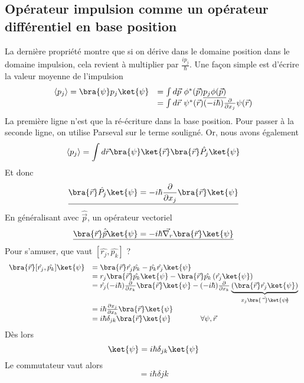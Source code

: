 	\subsection{Opérateur impulsion comme un opérateur différentiel en base position}
	La dernière propriété montre que si on dérive dans le domaine position dans le domaine impulsion, 
	cela revient à multiplier par $\frac{ip_j}{\hbar}$.  Une façon simple est d'écrire la valeur moyenne de 	
	l'impulsion
	\begin{equation}
	\begin{array}{ll}
	\langle p_j\rangle = \bra{\psi}p_j\ket{\psi} &= \int d\vec{p}\ \phi^*(\vec{p})\underline{p_j\phi(\vec{p})}\\
	&= \int d\vec{r}\ \psi^*(\vec{r})(-i\hbar)\frac{\partial}{\partial x_j}\psi(\vec{r})
	\end{array}
	\end{equation}	
	La première ligne n'est que la ré-écriture dans la base position. Pour passer à la seconde ligne, 
	on utilise Parseval sur le terme souligné. Or, nous avons également
	\begin{equation}
	\langle p_j\rangle = \int d\vec{r}	 \bra{\psi}\ket{\vec{r}}\bra{\vec{r}}\hat{P_j}\ket{\psi}
	\end{equation}
	Et donc
	\begin{equation}
	\underline{\bra{\vec{r}}\hat{P_j}\ket{\psi} = -i\hbar\dfrac{\partial}{\partial x_j}\bra{\vec{r}}\ket{\psi}}
	\end{equation}
	En généralisant avec $\hat{\vec{p}}$, un opérateur vectoriel
	\begin{equation}
	\underline{\bra{\vec{r}}\hat{\vec{p}}\ket{\psi} = -i\hbar\vec{\nabla_r}\bra{\vec{r}}\ket{\psi}}
	\end{equation}
	Pour s'amuser, que vaut $[\hat{r_j},\hat{p_k}]$ ? 
	\begin{equation}
	\begin{array}{ll}
	\bra{\vec{r}}[\hat{r_j},\hat{p_k}]\ket{\psi} &= \bra{\vec{r}}\hat{r_j}\hat{p_k}-\hat{p_k}\hat{r_j}\ket{\psi}\\
	&= r_j\bra{\vec{r}}\hat{p_k}\ket{\psi}-\bra{\vec{r}}\hat{p_k}\left(\hat{r_j}\ket{\psi}\right)\\
	&= \hat{r_j}(-i\hbar)\frac{\partial}{\partial x_k}\bra{\vec{r}}\ket{\psi}-(-i\hbar)\frac{\partial}{\partial
	 x_k}\underbrace{\left(\bra{\vec{r}}\hat{r_j}\ket{\psi}\right)}_{\hat{x_j\bra{\vec{r}}\ket{\psi}}}\\
	&= i\hbar\frac{\partial x_j}{\partial x_k}\bra{\vec{r}}\ket{\psi}\\
	&= i\hbar\delta_{jk}\bra{\vec{r}}\ket{\psi}\qquad\qquad\forall \psi,\vec{r}
	\end{array}
	\end{equation}
	Dès lors
	\begin{equation}
	[\hat{r_j},\hat{p_k}]\ket{\psi} = i\hbar\delta_{jk}\ket{\psi}
	\end{equation}
	Le commutateur vaut alors
	\begin{equation}
	[\hat{r_j},\hat{p_k}] = i\hbar\delta{jk}
	\end{equation}
	
